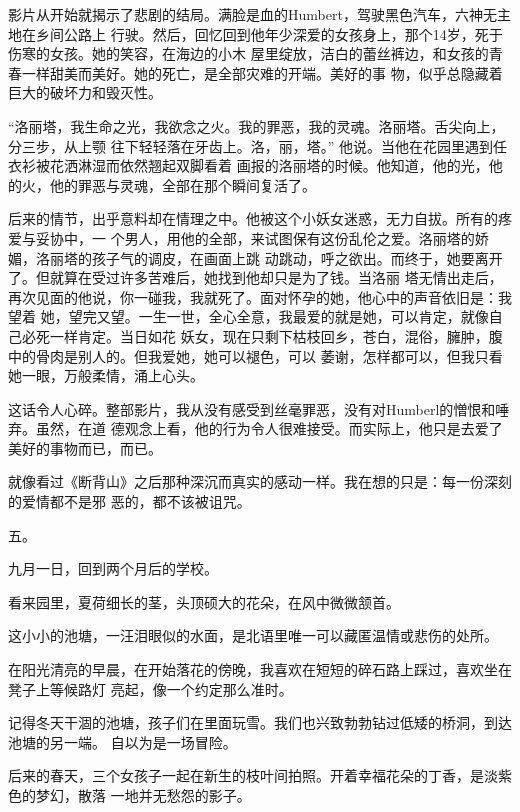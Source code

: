 \documentclass[12pt,a4paper]{article}
\newcommand{\subpart}[1]{
	\begingroup \par
	\vspace{1ex} \centering #1
	\par \endgroup
}
\begin{document}
		影片从开始就揭示了悲剧的结局。满脸是血的Humbert，驾驶黑色汽车，六神无主地在乡间公路上
	行驶。然后，回忆回到他年少深爱的女孩身上，那个14岁，死于伤寒的女孩。她的笑容，在海边的小木
	屋里绽放，洁白的蕾丝裤边，和女孩的青春一样甜美而美好。她的死亡，是全部灾难的开端。美好的事
	物，似乎总隐藏着巨大的破坏力和毁灭性。

		“洛丽塔，我生命之光，我欲念之火。我的罪恶，我的灵魂。洛丽塔。舌尖向上，分三步，从上颚
	往下轻轻落在牙齿上。洛，丽，塔。” 他说。当他在花园里遇到任衣衫被花洒淋湿而依然翘起双脚看着
	画报的洛丽塔的时候。他知道，他的光，他的火，他的罪恶与灵魂，全部在那个瞬间复活了。

		后来的情节，出乎意料却在情理之中。他被这个小妖女迷惑，无力自拔。所有的疼爱与妥协中，一
	个男人，用他的全部，来试图保有这份乱伦之爱。洛丽塔的娇媚，洛丽塔的孩子气的调皮，在画面上跳
	动跳动，呼之欲出。而终于，她要离开了。但就算在受过许多苦难后，她找到他却只是为了钱。当洛丽
	塔无情出走后，再次见面的他说，你一碰我，我就死了。面对怀孕的她，他心中的声音依旧是：我望着
	她，望完又望。一生一世，全心全意，我最爱的就是她，可以肯定，就像自己必死一样肯定。当日如花
	妖女，现在只剩下枯枝回乡，苍白，混俗，臃肿，腹中的骨肉是别人的。但我爱她，她可以褪色，可以
	萎谢，怎样都可以，但我只看她一眼，万般柔情，涌上心头。

		这话令人心碎。整部影片，我从没有感受到丝毫罪恶，没有对Humberl的憎恨和唾弃。虽然，在道
	德观念上看，他的行为令人很难接受。而实际上，他只是去爱了美好的事物而已，而已。

		就像看过《断背山》之后那种深沉而真实的感动一样。我在想的只是：每一份深刻的爱情都不是邪
	恶的，都不该被诅咒。

	\endwriting



		\subpart{五。}

		九月一日，回到两个月后的学校。

		看来园里，夏荷细长的茎，头顶硕大的花朵，在风中微微颔首。

		这小小的池塘，一汪泪眼似的水面，是北语里唯一可以藏匿温情或悲伤的处所。

		在阳光清亮的早晨，在开始落花的傍晚，我喜欢在短短的碎石路上踩过，喜欢坐在凳子上等候路灯
	亮起，像一个约定那么准时。

		记得冬天干涸的池塘，孩子们在里面玩雪。我们也兴致勃勃钻过低矮的桥洞，到达池塘的另一端。
	自以为是一场冒险。

		后来的春天，三个女孩子一起在新生的枝叶间拍照。开着幸福花朵的丁香，是淡紫色的梦幻，散落
	一地并无愁怨的影子。
\end{document}
